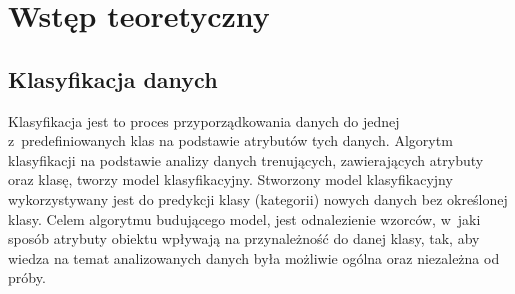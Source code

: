 \chapter{Wstęp teoretyczny}
\section{Klasyfikacja danych}
Klasyfikacja jest to proces przyporządkowania danych do jednej z predefiniowanych klas na podstawie atrybutów tych danych. Algorytm klasyfikacji na podstawie analizy danych trenujących, zawierających atrybuty oraz klasę, tworzy model klasyfikacyjny. Stworzony model klasyfikacyjny wykorzystywany jest do predykcji klasy (kategorii) nowych danych bez określonej klasy. Celem algorytmu budującego model, jest  odnalezienie wzorców, w jaki sposób atrybuty obiektu wpływają na przynależność do danej klasy, tak, aby wiedza na temat analizowanych danych była możliwie ogólna oraz niezależna od próby.

